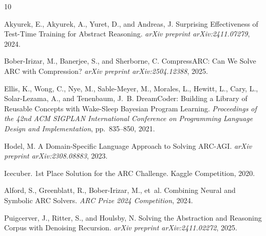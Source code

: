 \documentclass[11pt]{article}
\begin{document}


\begin{thebibliography}{10}

Akyurek, E., Akyurek, A., Yuret, D., and Andreas, J.
\newblock Surprising Effectiveness of Test-Time Training for Abstract Reasoning.
\newblock \emph{arXiv preprint arXiv:2411.07279}, 2024.

Bober-Irizar, M., Banerjee, S., and Sherborne, C.
\newblock CompressARC: Can We Solve ARC with Compression?
\newblock \emph{arXiv preprint arXiv:2504.12388}, 2025.

Ellis, K., Wong, C., Nye, M., Sable-Meyer, M., Morales, L., Hewitt, L.,
  Cary, L., Solar-Lezama, A., and Tenenbaum, J.~B.
\newblock DreamCoder: Building a Library of Reusable Concepts with Wake-Sleep
  Bayesian Program Learning.
\newblock \emph{Proceedings of the 42nd ACM SIGPLAN International Conference on
  Programming Language Design and Implementation}, pp.\ 835--850, 2021.

Hodel, M.
\newblock A Domain-Specific Language Approach to Solving ARC-AGI.
\newblock \emph{arXiv preprint arXiv:2308.08883}, 2023.

Icecuber.
\newblock 1st Place Solution for the ARC Challenge.
\newblock Kaggle Competition, 2020.

Alford, S., Greenblatt, R., Bober-Irizar, M., et~al.
\newblock Combining Neural and Symbolic ARC Solvers.
\newblock \emph{ARC Prize 2024 Competition}, 2024.

Puigcerver, J., Ritter, S., and Houlsby, N.
\newblock Solving the Abstraction and Reasoning Corpus with Denoising
  Recursion.
\newblock \emph{arXiv preprint arXiv:2411.02272}, 2025.

\end{thebibliography}
\end{document}

